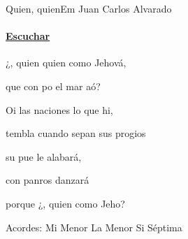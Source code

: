 \documentclass[12pt, spanish]{book}
\begin{document}
    \begin{song}{Quien, quien}{Em}
    {} %
    {Juan Carlos Alvarado}
    {} %
    {} %
        \ifChordBk
        \paragraph{\mbox{}\hfill\protect\href{https://open.spotify.com/intl-es/track/1cJ31ZenICNnh523eHpEwa}{Escuchar}\mbox{}\hfill}
        \fi

        \begin{SBOpGroup}
            ¿, quien quien como Jehová,

            que con  po el mar aó?
        \end{SBOpGroup}

        \begin{SBOpGroup}
            Oi las naciones lo que hi,

            tembla cuando sepan sus progios

            su pue le alabará,

            con panros danzará

            porque ¿, quien  como Jeho?
        \end{SBOpGroup}

        \ifChordBk
        \begin{SBOpGroup}
            Acordes:
            \upchord{\Em}\qquad Mi Menor \hfill
            \upchord{\Am}\qquad La Menor \hfill\null\break
            \upchord{\Bseven}\qquad Si S\'eptima \hfill\null\break
        \end{SBOpGroup}
        \fi
    \end{song}
\end{document}
